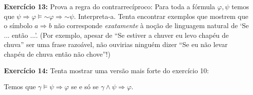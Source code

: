 \documentclass{article}
\theoremstyle{definition}
\theoremstyle{remark}
\newcommand*{\lneg}{\mathord{\sim}}
\begin{document}
	\textbf{Exercício 13:} Prova a regra do contrarrecíproco: Para toda a fórmula $\varphi, \psi$ temos que $\psi \Rightarrow \varphi \vDash \lneg \varphi \Rightarrow \lneg \psi$. Interpreta-a. Tenta encontrar exemplos que mostrem que o símbolo $a \Rightarrow b$ não corresponde \emph{exatamente} à noção de linguagem natural de `Se ... então ...'. (Por exemplo, apesar de ``Se estiver a chuver eu levo chapéu de chuva'' ser uma frase razoável, não ouvirias ninguém dizer ``Se eu não levar chapéu de chuva então não chove''!)
	
	\smallskip
	
	\textbf{Exercício 14:} Tenta mostrar uma versão mais forte do exercício 10:
	
	Temos que $\gamma \vDash \psi \Rightarrow \varphi$ se e só se $\gamma \land \psi \Rightarrow \varphi$.
	
\end{document}

